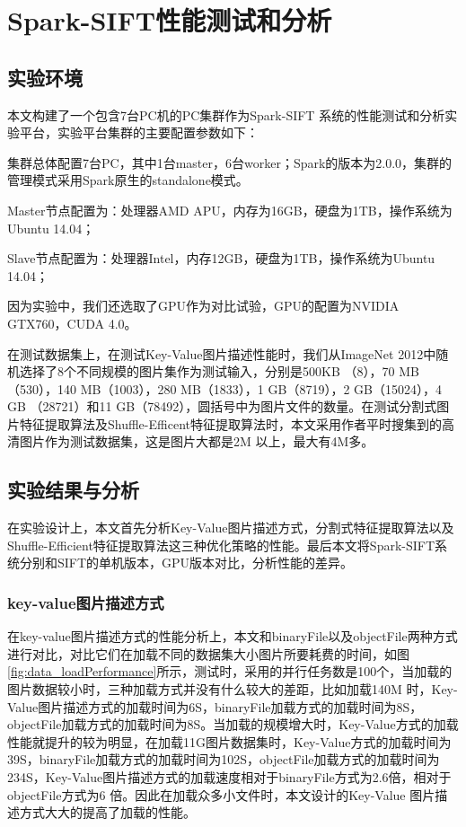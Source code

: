 ﻿\chapter{Spark-SIFT性能测试和分析}
\section{实验环境}
本文构建了一个包含7台PC机的PC集群作为Spark-SIFT 系统的性能测试和分析实验平台，实验平台集群的主要配置参数如下：
\begin{compactenum}
\item 集群总体配置7台PC，其中1台master，6台worker；Spark的版本为2.0.0，集群的管理模式采用Spark原生的standalone模式。
\item Master节点配置为：处理器AMD APU，内存为16GB，硬盘为1TB，操作系统为Ubuntu 14.04；
\item Slave节点配置为：处理器Intel，内存12GB，硬盘为1TB，操作系统为Ubuntu 14.04；
\end{compactenum}

因为实验中，我们还选取了GPU作为对比试验，GPU的配置为NVIDIA GTX760，CUDA 4.0。

在测试数据集上，在测试Key-Value图片描述性能时，我们从ImageNet 2012中随机选择了8个不同规模的图片集作为测试输入，分别是500KB （8），70 MB（530），140 MB（1003），280 MB（1833），1 GB（8719），2 GB（15024），4 GB （28721）和11 GB（78492），圆括号中为图片文件的数量。在测试分割式图片特征提取算法及Shuffle-Efficent特征提取算法时，本文采用作者平时搜集到的高清图片作为测试数据集，这是图片大都是2M 以上，最大有4M多。
\section{实验结果与分析}
在实验设计上，本文首先分析Key-Value图片描述方式，分割式特征提取算法以及Shuffle-Efficient特征提取算法这三种优化策略的性能。最后本文将Spark-SIFT系统分别和SIFT的单机版本，GPU版本对比，分析性能的差异。
\subsection{key-value图片描述方式}
在key-value图片描述方式的性能分析上，本文和binaryFile以及objectFile两种方式进行对比，对比它们在加载不同的数据集大小图片所要耗费的时间，如图\ref{fig:data_loadPerformance}所示，测试时，采用的并行任务数是100个，当加载的图片数据较小时，三种加载方式并没有什么较大的差距，比如加载140M 时，Key-Value图片描述方式的加载时间为6S，binaryFile加载方式的加载时间为8S，objectFile加载方式的加载时间为8S。当加载的规模增大时，Key-Value方式的加载性能就提升的较为明显，在加载11G图片数据集时，Key-Value方式的加载时间为39S，binaryFile加载方式的加载时间为102S，objectFile加载方式的加载时间为234S，Key-Value图片描述方式的加载速度相对于binaryFile方式为2.6倍，相对于objectFile方式为6 倍。因此在加载众多小文件时，本文设计的Key-Value 图片描述方式大大的提高了加载的性能。

